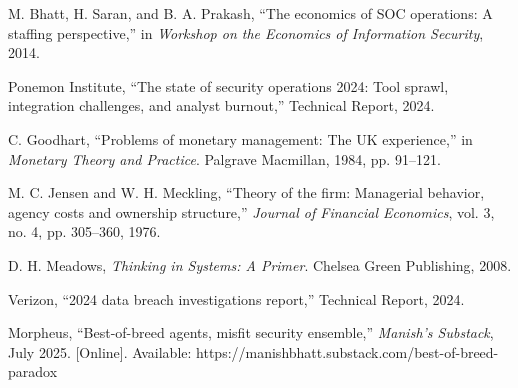 \documentclass[10pt,conference]{IEEEtran}
\begin{document}
\begin{thebibliography}{10}
M. Bhatt, H. Saran, and B. A. Prakash, ``The economics of SOC operations: A staffing perspective,'' in \textit{Workshop on the Economics of Information Security}, 2014.

Ponemon Institute, ``The state of security operations 2024: Tool sprawl, integration challenges, and analyst burnout,'' Technical Report, 2024.

C. Goodhart, ``Problems of monetary management: The UK experience,'' in \textit{Monetary Theory and Practice}. Palgrave Macmillan, 1984, pp. 91--121.

M. C. Jensen and W. H. Meckling, ``Theory of the firm: Managerial behavior, agency costs and ownership structure,'' \textit{Journal of Financial Economics}, vol. 3, no. 4, pp. 305--360, 1976.

D. H. Meadows, \textit{Thinking in Systems: A Primer}. Chelsea Green Publishing, 2008.

Verizon, ``2024 data breach investigations report,'' Technical Report, 2024.

Morpheus, ``Best-of-breed agents, misfit security ensemble,'' \textit{Manish's Substack}, July 2025. [Online]. Available: https://manishbhatt.substack.com/best-of-breed-paradox

\end{thebibliography}
\end{document}
